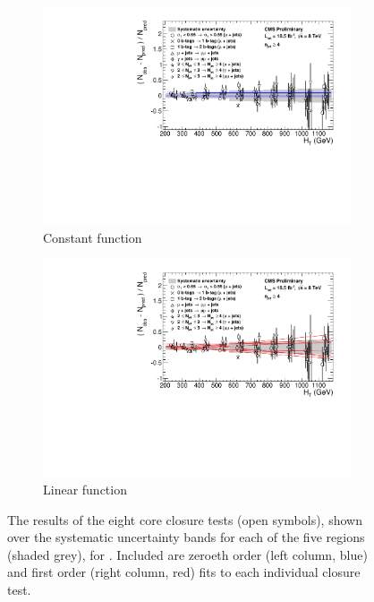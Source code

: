 \begin{figure}[p]
  \begin{subfigure}[b]{0.9\textwidth}
    \includegraphics[width=\textwidth]{Figs/syst/v0/ge4j/summary_plot_pol0}
    \caption{Constant function}
    \label{fig:closure_fit_ge4j_pol0}
  \end{subfigure}
  \begin{subfigure}[b]{0.9\textwidth}
    \includegraphics[width=\textwidth]{Figs/syst/v0/ge4j/summary_plot_pol1}
    \caption{Linear function}
    \label{fig:closure_fit_ge4j_pol1}
  \end{subfigure}
  \caption{The results of the eight core closure tests (open symbols), shown 
  over the systematic uncertainty bands for each of the five \HT regions
  (shaded grey), for \njhigh. Included are zeroeth order (left column, blue)
  and first order (right column, red) fits to each individual closure test.}
  \label{fig:closure_fits_ge4j}
\end{figure}

